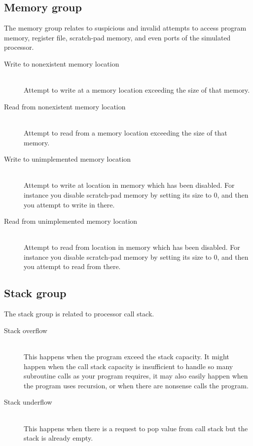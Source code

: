     \subsection{Memory group}
        The memory group relates to suspicious and invalid attempts to access program memory, register file, scratch-pad memory, and even ports of the simulated processor.
        \begin{description}
            \item[Write to nonexistent memory location]~\\ %
                Attempt to write at a memory location exceeding the size of that memory.
            \item[Read from nonexistent memory location]~\\ %
                Attempt to read from a memory location exceeding the size of that memory.
            \item[Write to unimplemented memory location]~\\ %
                Attempt to write at location in memory which has been disabled. For instance you disable scratch-pad memory by setting its size to 0, and then you attempt to write in there.
            \item[Read from unimplemented memory location]~\\ %
                Attempt to read from location in memory which has been disabled. For instance you disable scratch-pad memory by setting its size to 0, and then you attempt to read from there.
        \end{description}

    \subsection{Stack group}
        The stack group is related to processor call stack.
        \begin{description}
            \item[Stack overflow]~\\ %
                This happens when the program exceed the stack capacity. It might happen when the call stack capacity is insufficient to handle so many subroutine calls as your program requires, it may also easily happen when the program uses recursion, or when there are nonsense calls the program.
            \item[Stack underflow]~\\ %
                This happens when there is a request to pop value from call stack but the stack is already empty.
        \end{description}


